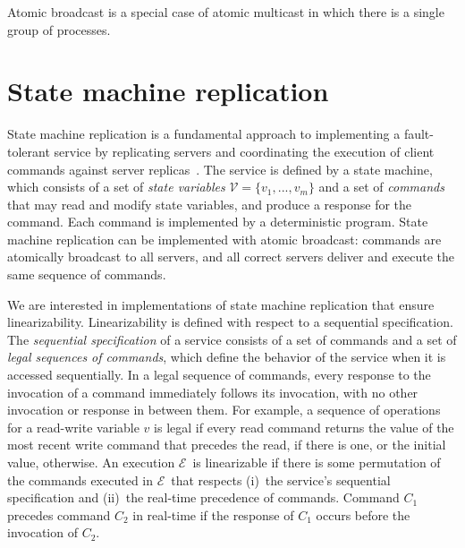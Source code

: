 \documentclass[11pt]{article}
\newcommand{\ex}{$\mathcal{E}$}
\newcommand{\vvm}{\mathcal{V}}
\begin{document}
Atomic broadcast is a special case of atomic multicast in which there is a single group of processes.


%



\section{State machine replication}
\label{sec:smr}

State machine replication is a fundamental approach to implementing a fault-tolerant service by replicating servers and coordinating the execution of client commands against server replicas~\cite{Lam78, Sch90}. 
The service is defined by a state machine, which consists of a set of \emph{state variables} $\vvm = \{v_1, ..., v_m\}$ 
and a set of \emph{commands} that may read and modify state variables, and produce a response for the command.
Each command is implemented by a deterministic program.
State machine replication can be implemented with atomic broadcast: commands are atomically broadcast to all servers, and all correct servers deliver and execute the same sequence of commands.

We are interested in implementations of state machine replication that ensure linearizability.
%
Linearizability is defined with respect to a sequential specification.
The \emph{sequential specification} of a service consists of a set of commands and a set of \emph{legal sequences of commands}, which define the behavior of the service when it is accessed sequentially.
In a legal sequence of commands, every response to the invocation of a command immediately follows its invocation, with no other invocation or response in between them.
For example, a sequence of operations for a read-write variable $v$ is legal if every read command returns the value of the most recent write command that precedes the read, if there is one, or the initial value, otherwise.
An execution \ex\ is linearizable if there is some permutation of the commands executed in \ex\ that respects (i)~the service's sequential specification and (ii)~the real-time precedence of commands.
Command $C_1$ precedes command $C_2$ in real-time if the response of $C_1$ occurs before the invocation of $C_2$.
\end{document}
